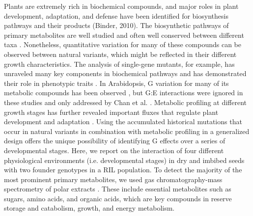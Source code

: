 Plants are extremely rich in biochemical compounds, and major roles in plant development, adaptation, 
and defense have been identified for biosynthesis pathways and their products (Binder, 2010). The 
biosynthetic pathways of primary metabolites are well studied and often well conserved between 
different taxa \cite{Peregrin-Alvarez:2009}. Nonetheless, quantitative variation for many of 
these compounds can be observed between natural variants, which might be reflected in their different 
growth characteristics. The analysis of single-gene mutants, for example, has unraveled many key 
components in biochemical pathways and has demonstrated their role in phenotypic traits 
\cite{Fiehn:2000}. In Arabidopsis, G variation for many of its metabolic compounds has been 
observed \cite{Kliebenstein:2001, Rowe:2008, Keurentjes:2006}, but G:E interactions 
were ignored in these studies and only addressed by Chan et al. \cite{Chan:2011}. Metabolic profiling at different 
growth stages has further revealed important fluxes that regulate plant development and adaptation 
\cite{Oliveira:2010}. Using the accumulated historical mutations that occur in natural 
variants in combination with metabolic profiling in a generalized design offers the unique possibility 
of identifying G effects over a series of developmental stages. Here, we report on the interaction of 
four different physiological environments (i.e. developmental stages) in dry and imbibed seeds with 
two founder genotypes in a RIL population. To detect the majority of the most prominent primary 
metabolites, we used gas chromatography-mass spectrometry of polar extracts \cite{Roessner:2000, 
Lisec:2008}. These include essential metabolites such as sugars, amino acids, and organic 
acids, which are key compounds in reserve storage and catabolism, growth, and energy metabolism.


